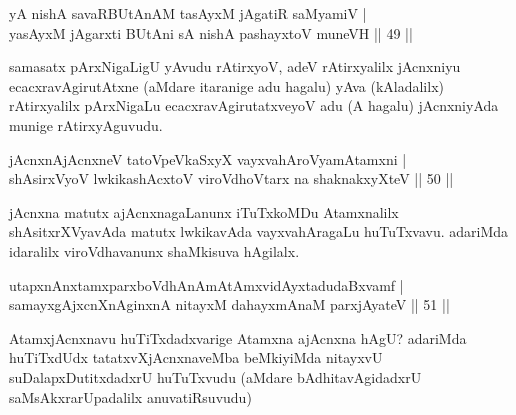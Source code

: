 \begin{shl}
\footnotemark[1]yA nishA savaRBUtAnAM tasAyxM jAgatiR saMyamiV |\\
yasAyxM jAgarxti BUtAni sA nishA pashayxtoV muneVH \hfill || 49 ||
\end{shl}

\begin{artha}
samasatx pArxNigaLigU yAvudu rAtirxyoV, adeV rAtirxyalilx jAcnxniyu ecacxravAgirutAtxne (aMdare itaranige adu hagalu) yAva (kAladalilx) rAtirxyalilx pArxNigaLu ecacxravAgirutatxveyoV adu (A hagalu) jAcnxniyAda munige rAtirxyAguvudu.
\end{artha}

\begin{shl}
jAcnxnAjAcnxneV tatoV\s peVkaSxyX vayxvahAroV\s yamAtamxni |\\
shAsirxVyoV lwkikashAcxtoV viroVdhoV\s tarx na shaknakxyXteV \hfill || 50 ||
\end{shl}

\begin{artha}%
jAcnxna matutx ajAcnxnagaLanunx iTuTxkoMDu Atamxnalilx shAsitxrXVyavAda matutx lwkikavAda vayxvahAragaLu huTuTxvavu. adariMda idaralilx viroVdhavanunx shaMkisuva hAgilalx.
\end{artha}


\begin{shl}
utapxnAnxtamxparxboVdhAnAmAtAmxvidAyxtadudaBxvamf |\\
samayxgAjxcnXnAginxnA nitayxM dahayxmAnaM parxjAyateV \hfill || 51 ||
\end{shl}

\begin{artha}
AtamxjAcnxnavu huTiTxdadxvarige Atamxna ajAcnxna hAgU? adariMda huTiTxdUdx tatatxvXjAcnxnaveMba beMkiyiMda nitayxvU suDalapxDutitxdadxrU huTuTxvudu (aMdare bAdhitavAgidadxrU saMsAkxrarUpadalilx anuvatiRsuvudu) 
\end{artha}

